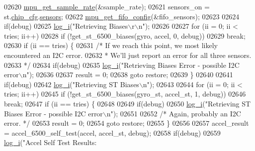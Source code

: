 \begin{DoxyCode}
{{{{{{{{{{{{{{{{{{{{{{{{{{{{{{{02620     \hyperlink{group___d_r_i_v_e_r_s_ga2487dd551b701c1c7ed4d6335f02b2f1}{mpu\_get\_sample\_rate}(&sample\_rate);
02621     sensors\_on = st.\hyperlink{structgyro__state__s_ac895217592e2084bd520b0be8e9d20ee}{chip\_cfg}.\hyperlink{structchip__cfg__s_aaa21c01566947e7007476657cb614e3f}{sensors};
02622     \hyperlink{group___d_r_i_v_e_r_s_ga093f11eb10b2639a4b9fe344ea348c54}{mpu\_get\_fifo\_config}(&fifo\_sensors);
02623 
02624     \textcolor{keywordflow}{if}(debug)
02625         \hyperlink{inv__mpu_8c_a67fc07fa528d8e62dc7b88a847b563f5}{log\_i}(\textcolor{stringliteral}{"Retrieving Biases\(\backslash\)r\(\backslash\)n"});
02626 
02627     \textcolor{keywordflow}{for} (ii = 0; ii < tries; ii++)
02628         \textcolor{keywordflow}{if} (!get\_st\_6500\_biases(gyro, accel, 0, debug))
02629             \textcolor{keywordflow}{break};
02630     \textcolor{keywordflow}{if} (ii == tries) \{
02631         \textcolor{comment}{/* If we reach this point, we most likely encountered an I2C error.}
02632 \textcolor{comment}{         * We'll just report an error for all three sensors.}
02633 \textcolor{comment}{         */}
02634         \textcolor{keywordflow}{if}(debug)
02635             \hyperlink{inv__mpu_8c_a67fc07fa528d8e62dc7b88a847b563f5}{log\_i}(\textcolor{stringliteral}{"Retrieving Biases Error - possible I2C error\(\backslash\)n"});
02636 
02637         result = 0;
02638         \textcolor{keywordflow}{goto} restore;
02639     \}
02640 
02641     \textcolor{keywordflow}{if}(debug)
02642         \hyperlink{inv__mpu_8c_a67fc07fa528d8e62dc7b88a847b563f5}{log\_i}(\textcolor{stringliteral}{"Retrieving ST Biases\(\backslash\)n"});
02643 
02644     \textcolor{keywordflow}{for} (ii = 0; ii < tries; ii++)
02645         \textcolor{keywordflow}{if} (!get\_st\_6500\_biases(gyro\_st, accel\_st, 1, debug))
02646             \textcolor{keywordflow}{break};
02647     \textcolor{keywordflow}{if} (ii == tries) \{
02648 
02649         \textcolor{keywordflow}{if}(debug)
02650             \hyperlink{inv__mpu_8c_a67fc07fa528d8e62dc7b88a847b563f5}{log\_i}(\textcolor{stringliteral}{"Retrieving ST Biases Error - possible I2C error\(\backslash\)n"});
02651 
02652         \textcolor{comment}{/* Again, probably an I2C error. */}
02653         result = 0;
02654         \textcolor{keywordflow}{goto} restore;
02655     \}
02656 
02657     accel\_result = accel\_6500\_self\_test(accel, accel\_st, debug);
02658     \textcolor{keywordflow}{if}(debug)
02659         \hyperlink{inv__mpu_8c_a67fc07fa528d8e62dc7b88a847b563f5}{log\_i}(\textcolor{stringliteral}{"Accel Self Test Results: %
}}}}}}}}}}}}}}}}}}}}}}}}}}}}}}}}
\end{DoxyCode}
